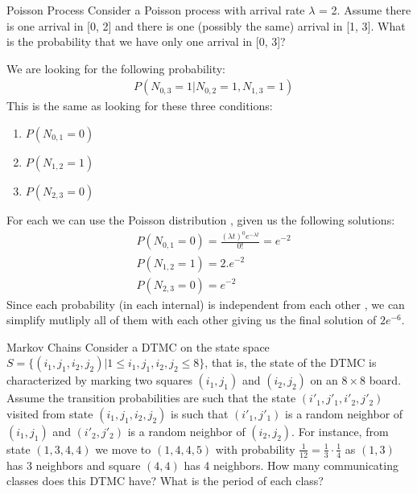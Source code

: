 \begin{problem}{Poisson Process}
Consider a Poisson process with arrival rate $\lambda$ = 2. Assume there is one arrival in [0, 2] and there is one (possibly the same) arrival in [1, 3]. What is the probability that we have only one arrival in [0, 3]?
\end{problem}

\begin{solution}
We are looking for the following probability:
\begin{align*}
    &P(N_{0,3}=1 |N_{0,2}=1, N_{1,3}=1)
\end{align*}
This is the same as looking for these three conditions:
\begin{enumerate}
    \item $P(N_{0,1}=0)$
    \item $P(N_{1,2}=1)$
    \item $P(N_{2,3}=0)$
\end{enumerate}
For each we can use the Poisson distribution , given us the following solutions:
\begin{align*}
    &P(N_{0,1}=0)= \frac{(\lambda t) ^0 e^ {-\lambda t}}{0!}= e^{-2}\\
    &P(N_{1,2}=1)=2.e^{-2}\\
    &P(N_{2,3}=0)=e^{-2}
\end{align*}
Since each probability (in each internal) is independent from each other , we can simplify mutliply all of them with each other giving us the final solution of $2e^{-6}$.
\end{solution}

\begin{problem}{Markov Chains}
Consider a DTMC on the state space \( S = \{(i_1, j_1, i_2, j_2) | 1 \leq i_1, j_1, i_2, j_2 \leq 8\} \), that is, the state of the DTMC is characterized by marking two squares \( (i_1, j_1) \) and \( (i_2, j_2) \) on an \( 8 \times 8 \) board. Assume the transition probabilities are such that the state \( (i'_1, j'_1, i'_2, j'_2) \) visited from state \( (i_1, j_1, i_2, j_2) \) is such that \( (i'_1, j'_1) \) is a random neighbor of \( (i_1, j_1) \) and \( (i'_2, j'_2) \) is a random neighbor of \( (i_2, j_2) \). For instance, from state \( (1, 3, 4, 4) \) we move to \( (1, 4, 4, 5) \) with probability \( \frac{1}{12} = \frac{1}{3} \cdot \frac{1}{4} \) as \( (1, 3) \) has 3 neighbors and square \( (4, 4) \) has 4 neighbors. How many communicating classes does this DTMC have? What is the period of each class?
\end{problem}


